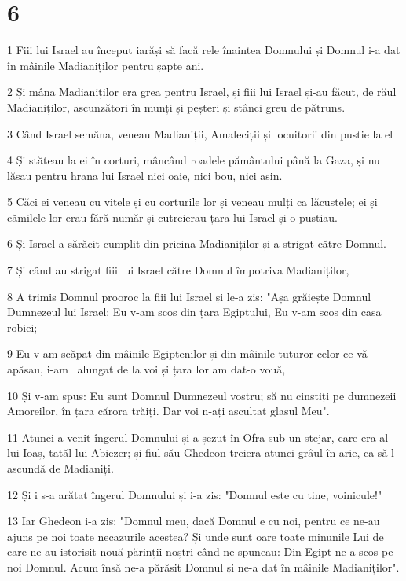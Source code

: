 \chapter{6}

\par 1 Fiii lui Israel au început iarăși să facă rele înaintea Domnului și Domnul i-a dat în mâinile Madianiților pentru șapte ani.
\par 2 Și mâna Madianiților era grea pentru Israel, și fiii lui Israel și-au făcut, de răul Madianiților, ascunzători în munți și peșteri și stânci greu de pătruns.
\par 3 Când Israel semăna, veneau Madianiții, Amaleciții și locuitorii din pustie la el
\par 4 Și stăteau la ei în corturi, mâncând roadele pământului până la Gaza, și nu lăsau pentru hrana lui Israel nici oaie, nici bou, nici asin.
\par 5 Căci ei veneau cu vitele și cu corturile lor și veneau mulți ca lăcustele; ei și cămilele lor erau fără număr și cutreierau țara lui Israel și o pustiau.
\par 6 Și Israel a sărăcit cumplit din pricina Madianiților și a strigat către Domnul.
\par 7 Și când au strigat fiii lui Israel către Domnul împotriva Madianiților,
\par 8 A trimis Domnul prooroc la fiii lui Israel și le-a zis: "Așa grăiește Domnul Dumnezeul lui Israel: Eu v-am scos din țara Egiptului, Eu v-am scos din casa robiei;
\par 9 Eu v-am scăpat din mâinile Egiptenilor și din mâinile tuturor celor ce vă apăsau, i-am  alungat de la voi și țara lor am dat-o vouă,
\par 10 Și v-am spus: Eu sunt Domnul Dumnezeul vostru; să nu cinstiți pe dumnezeii Amoreilor, în țara cărora trăiți. Dar voi n-ați ascultat glasul Meu".
\par 11 Atunci a venit îngerul Domnului și a șezut în Ofra sub un stejar, care era al lui Ioaș, tatăl lui Abiezer; și fiul său Ghedeon treiera atunci grâul în arie, ca să-l ascundă de Madianiți.
\par 12 Și i s-a arătat îngerul Domnului și i-a zis: "Domnul este cu tine, voinicule!"
\par 13 Iar Ghedeon i-a zis: "Domnul meu, dacă Domnul e cu noi, pentru ce ne-au ajuns pe noi toate necazurile acestea? Și unde sunt oare toate minunile Lui de care ne-au istorisit nouă părinții noștri când ne spuneau: Din Egipt ne-a scos pe noi Domnul. Acum însă ne-a părăsit Domnul și ne-a dat în mâinile Madianiților".

